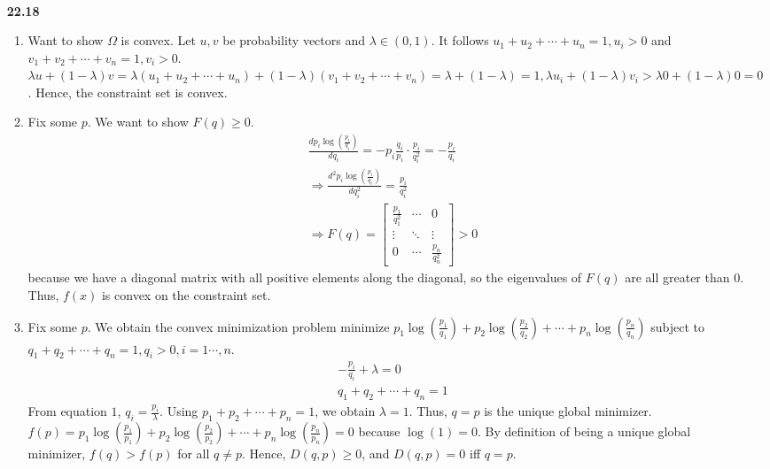 \documentclass[10pt]{article}
\begin{document}
\begin{enumerate}
\begin{enumerate}
\begin{align*}
        \end{align*}
    \end{enumerate}
    \item [\textbf{22.18}]\begin{enumerate}
        \item Want to show $\Omega$ is convex. Let $u,v$ be probability vectors and $\lambda\in (0,1)$. 
        It follows $u_1+u_2+\cdots+u_n=1,u_i>0$ and $v_1+v_2+\cdots+v_n=1,v_i>0$.
        $\lambda u+(1-\lambda)v=\lambda(u_1+u_2+\cdots+u_n)+(1-\lambda)(v_1+v_2+\cdots+v_n)=\lambda+(1-\lambda)=1,\lambda u_i+(1-\lambda)v_i>\lambda 0+(1-\lambda)0=0$.
        Hence, the constraint set is convex.
        \item Fix some $p$. We want to show $F(q)\ge 0$.\\
        \begin{align*}
            &\frac{d p_i\log(\frac{p_i}{q_i})}{d q_i}=-p_i\frac{q_i}{p_i}\cdot\frac{p_i}{q_i^2}=-\frac{p_i}{q_i}\\
            &\Rightarrow \frac{d^2 p_i\log(\frac{p_i}{q_i})}{d q_i^2}=\frac{p_i}{q_i^2}\\
            &\Rightarrow F(q)=\begin{bmatrix}
                \frac{p_1}{q_1^2} & \cdots & 0\\
                \vdots & \ddots & \vdots\\
                0 & \cdots & \frac{p_n}{q_n^2}
            \end{bmatrix}>0
        \end{align*}
        because we have a diagonal matrix with all positive elements along the diagonal, so the eigenvalues of $F(q)$ are all greater than $0$. Thus, $f(x)$ is convex on the constraint set.
        \item Fix some $p$. We obtain the convex minimization problem minimize $p_1\log(\frac{p_1}{q_1})+p_2\log(\frac{p_2}{q_2})+\cdots+p_n\log(\frac{p_n}{q_n})$ subject to $q_1+q_2+\cdots+q_n=1, q_i>0,i=1\cdots, n$.\\
        \begin{align*}
            &-\frac{p_i}{q_i}+\lambda=0\\
            &q_1+q_2+\cdots+q_n=1
        \end{align*}
        From equation $1$, $q_i=\frac{p_i}{\lambda}$. Using $p_1+p_2+\cdots+p_n=1$, we obtain $\lambda=1$. 
        Thus, $q=p$ is the unique global minimizer. 
        $f(p)=p_1\log(\frac{p_1}{p_1})+p_2\log(\frac{p_2}{p_2})+\cdots+p_n\log(\frac{p_n}{p_n})=0$ because $\log(1)=0$.
        By definition of being a unique global minimizer, $f(q)>f(p)$ for all $q\neq p$.
        Hence, $D(q,p)\ge0$, and $D(q,p)=0$ iff $q=p$.
    \end{enumerate}
\end{enumerate}
\end{document}
